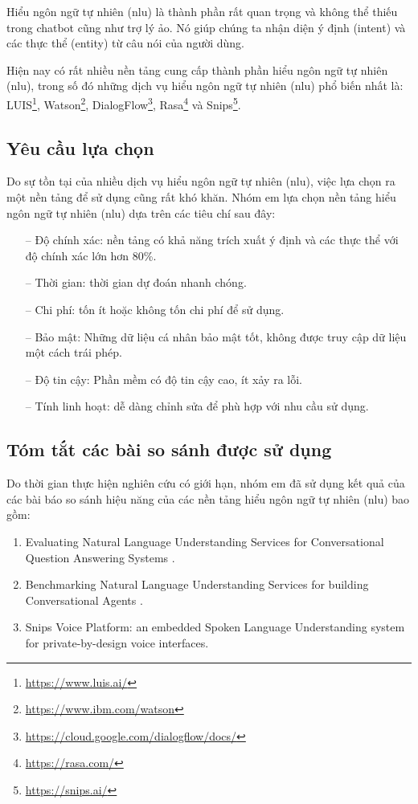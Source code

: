 Hiểu ngôn ngữ tự nhiên (\ac{nlu}) là thành phần rất quan trọng và không thể thiếu trong chatbot cũng như trợ lý ảo. Nó giúp chúng ta nhận diện ý định (intent) và các thực thể (entity) từ câu nói của người dùng.

Hiện nay có rất nhiều nền tảng cung cấp thành phần hiểu ngôn ngữ tự nhiên (\ac{nlu}), trong số đó những dịch vụ hiểu ngôn ngữ tự nhiên (\ac{nlu}) phổ biến nhất là: LUIS\footnote{\url{https://www.luis.ai/}}, Watson\footnote{\url{https://www.ibm.com/watson}}, DialogFlow\footnote{\url{https://cloud.google.com/dialogflow/docs/}}, Rasa\footnote{\url{https://rasa.com/}} và Snips\footnote{\url{https://snips.ai/}}.


\subsection{Yêu cầu lựa chọn}
Do sự tồn tại của nhiều dịch vụ hiểu ngôn ngữ tự nhiên (\ac{nlu}), việc lựa chọn ra một nền tảng để sử dụng cũng rất khó khăn. Nhóm em lựa chọn nền tảng hiểu ngôn ngữ tự nhiên (\ac{nlu}) dựa trên các tiêu chí sau đây:

\begin{itemize}
  \item[--] Độ chính xác: nền tảng có khả năng trích xuất ý định và các thực thể với độ chính xác lớn hơn 80\%.
  \item[--] Thời gian: thời gian dự đoán nhanh chóng.
    \item[--] Chi phí:  tốn ít hoặc không tốn chi phí để sử dụng.
    \item[--] Bảo mật: Những dữ liệu cá nhân bảo mật tốt, không được truy cập dữ liệu một cách trái phép.
    \item[--] Độ tin cậy: Phần mềm có độ tin cậy cao, ít xảy ra lỗi.
    \item[--] Tính linh hoạt: dễ dàng chỉnh sửa để phù hợp với nhu cầu sử dụng. 
\end{itemize}

\subsection{Tóm tắt các bài so sánh được sử dụng}

Do thời gian thực hiện nghiên cứu có giới hạn, nhóm em đã sử dụng kết quả của các bài báo so sánh hiệu năng của các nền tảng hiểu ngôn ngữ tự nhiên (\ac{nlu}) bao gồm:

\begin{enumerate}
    \item Evaluating Natural Language Understanding Services for Conversational Question Answering Systems \cite{EvaluatingNLU}.
    \item Benchmarking Natural Language Understanding Services for building Conversational Agents \cite{BenchmarkingNLU}.
    \item Snips Voice Platform: an embedded Spoken Language Understanding system for private-by-design voice interfaces\cite{snips-nlu}.
\end{enumerate}

